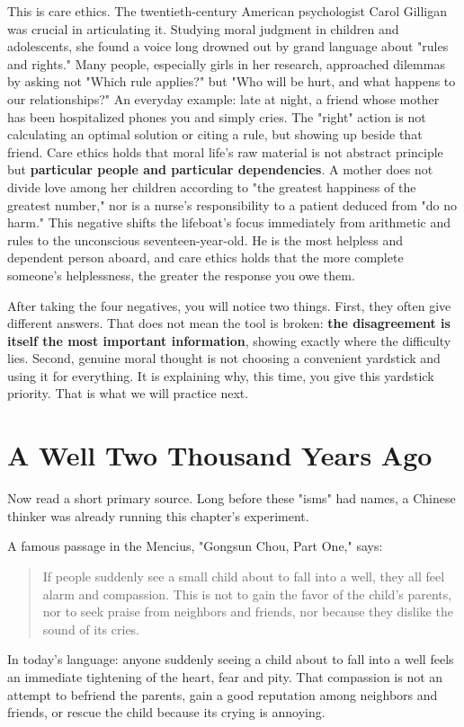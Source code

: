 This is care ethics. The twentieth-century American psychologist Carol Gilligan was crucial in articulating it. Studying moral judgment in children and adolescents, she found a voice long drowned out by grand language about "rules and rights." Many people, especially girls in her research, approached dilemmas by asking not "Which rule applies?" but "Who will be hurt, and what happens to our relationships?" An everyday example: late at night, a friend whose mother has been hospitalized phones you and simply cries. The "right" action is not calculating an optimal solution or citing a rule, but showing up beside that friend. Care ethics holds that moral life's raw material is not abstract principle but \textbf{particular people and particular dependencies}. A mother does not divide love among her children according to "the greatest happiness of the greatest number," nor is a nurse's responsibility to a patient deduced from "do no harm." This negative shifts the lifeboat's focus immediately from arithmetic and rules to the unconscious seventeen-year-old. He is the most helpless and dependent person aboard, and care ethics holds that the more complete someone's helplessness, the greater the response you owe them.

After taking the four negatives, you will notice two things. First, they often give different answers. That does not mean the tool is broken: \textbf{the disagreement is itself the most important information}, showing exactly where the difficulty lies. Second, genuine moral thought is not choosing a convenient yardstick and using it for everything. It is explaining why, this time, you give this yardstick priority. That is what we will practice next.

\section{A Well Two Thousand Years Ago}
Now read a short primary source. Long before these "isms" had names, a Chinese thinker was already running this chapter's experiment.

A famous passage in the Mencius, "Gongsun Chou, Part One," says:

\begin{quote}
If people suddenly see a small child about to fall into a well, they all feel alarm and compassion. This is not to gain the favor of the child's parents, nor to seek praise from neighbors and friends, nor because they dislike the sound of its cries.
\end{quote}
In today's language: anyone suddenly seeing a child about to fall into a well feels an immediate tightening of the heart, fear and pity. That compassion is not an attempt to befriend the parents, gain a good reputation among neighbors and friends, or rescue the child because its crying is annoying.

